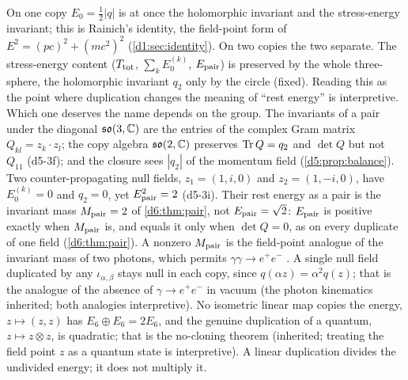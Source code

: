 \begin{remark}
\label{d5:rem:twoE0}
On one copy $E_0=\tfrac12|q|$ is at once the holomorphic invariant and the stress-energy invariant; this is Rainich's identity, the field-point
form of $E^2=(pc)^2+(mc^2)^2$ (\cref{d1:sec:identity}). On two copies the two separate. The stress-energy content ($T_{\rm tot}$,
$\sum_kE_0^{(k)}$, $E_{\rm pair}$) is preserved by the whole three-sphere, the holomorphic invariant $q_2$ only by the circle (fixed). Reading this as the
point where duplication changes the meaning of ``rest energy'' is interpretive. Which one deserves the name depends on the group. The invariants of a pair
under the diagonal $\mathfrak{so}(3,\mathbb{C})$ are the entries of the complex Gram matrix $Q_{kl}=z_k\cdot z_l$; the copy algebra $\mathfrak{so}(2,\mathbb{C})$ preserves
$\operatorname{Tr} Q=q_2$ and $\det Q$ but not $Q_{11}$ (d5-3f); and the closure sees $|q_2|$ of the momentum field (\cref{d5:prop:balance}). Two
counter-propagating null fields, $z_1=(1,i,0)$ and $z_2=(1,-i,0)$, have $E_0^{(k)}=0$ and $q_2=0$, yet $E_{\rm pair}^2=2$ (d5-3i). Their rest energy as a pair is the invariant mass $M_{\rm pair}=2$ of \cref{d6:thm:pair}, not
$E_{\rm pair}=\sqrt2$: $E_{\rm pair}$ is positive exactly when $M_{\rm pair}$ is, and equals it only when $\det Q=0$, as on every duplicate of one field
(\cref{d6:thm:pair}). A nonzero $M_{\rm pair}$ is the field-point analogue of the invariant mass of two photons, which permits $\gamma\gamma\to e^+e^-$ \cite{BreitWheeler34}. A single null field
duplicated by any $\iota_{\alpha,\beta}$ stays null in each copy, since $q(\alpha z)=\alpha^2q(z)$; that is the analogue of the absence of
$\gamma\to e^+e^-$ in vacuum (the photon kinematics inherited; both analogies interpretive). No isometric linear map copies the energy, $z\mapsto(z,z)$ has $E_6\oplus E_6=2E_6$, and the
genuine duplication of a quantum, $z\mapsto z\otimes z$, is quadratic; that is the no-cloning theorem \cite{WoottersZurek82} (inherited; treating the field point $z$ as a quantum state is interpretive). A
linear duplication divides the undivided energy; it does not multiply it.
\end{remark}


